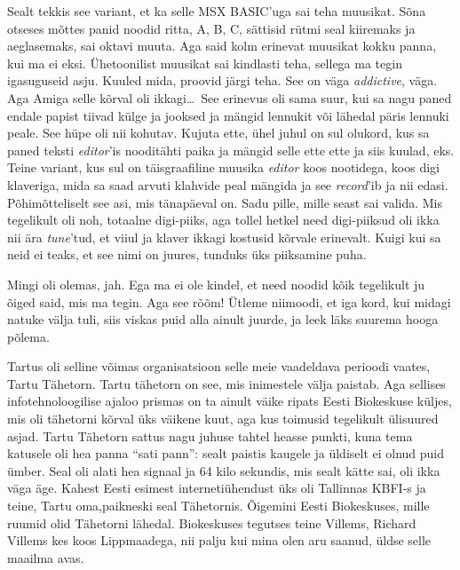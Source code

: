Sealt tekkis see variant, et ka selle MSX BASIC'uga sai teha muusikat. Sõna otseses mõttes panid noodid ritta, A, B, C, sättisid 
rütmi seal kiiremaks ja aeglasemaks, sai oktavi muuta. Aga said 
kolm erinevat muusikat  kokku panna, kui ma ei eksi. Ühetoonilist muusikat sai 
kindlasti teha, sellega ma tegin igasuguseid asju. Kuuled mida, proovid 
järgi teha. See on väga \emph{addictive},  väga. Aga Amiga selle kõrval oli 
ikkagi\ldots\ See erinevus oli sama suur, kui sa nagu paned endale  papist 
tiivad külge ja jooksed ja mängid lennukit või lähedal päris lennuki peale. See 
hüpe oli nii kohutav. Kujuta ette, ühel juhul on sul olukord, kus sa 
paned teksti \emph{editor}'is  nooditähti paika ja mängid selle ette ette ja 
siis kuulad, eks. Teine variant, kus sul on  täisgraafiline muusika 
\emph{editor} koos nootidega,  koos digi klaveriga, mida sa saad arvuti 
klahvide peal mängida ja see \emph{record}'ib ja nii edasi. Põhimõtteliselt 
see asi, mis tänapäeval on. Sadu pille, mille seast sai valida. Mis 
tegelikult oli noh, totaalne digi-piiks, aga tollel hetkel need digi-piiksud 
oli ikka nii ära \emph{tune}'tud, et viiul ja klaver ikkagi kostusid kõrvale 
erinevalt. Kuigi kui sa neid ei teaks, et see nimi on juures, tunduks  üks 
 piiksamine puha. 


Mingi oli olemas, jah. Ega ma ei ole kindel, et need noodid kõik tegelikult ju õiged 
said, mis ma tegin. Aga see rõõm! Ütleme niimoodi, et iga kord, kui midagi 
natuke välja tuli, siis viskas puid alla ainult juurde, ja  
leek läks suurema hooga põlema. 

Tartus oli selline  võimas 
organisatsioon selle meie  vaadeldava  perioodi vaates, Tartu 
Tähetorn.
Tartu tähetorn on see, mis inimestele välja paistab. Aga sellises 
infotehnoloogilise ajaloo prismas on ta ainult väike ripats  Eesti  
Biokeskuse 
küljes, mis oli tähetorni kõrval üks väikene kuut, aga kus toimusid tegelikult 
ülisuured asjad. Tartu Tähetorn sattus nagu juhuse tahtel  heasse 
punkti, kuna tema katusele oli hea panna \enquote{sati pann}: 
 sealt paistis kaugele ja üldiselt  ei olnud puid ümber. Seal oli alati 
hea signaal ja 64 kilo sekundis, mis sealt kätte sai, oli ikka väga äge. Kahest Eesti 
esimest internetiühendust üks oli Tallinnas KBFI-s ja teine, Tartu oma,paikneski 
seal Tähetornis. Õigemini Eesti Biokeskuses, mille ruumid olid Tähetorni 
lähedal. Biokeskuses tegutses teine Villems, Richard Villems kes koos Lippmaadega, nii palju kui mina olen aru saanud, üldse selle  
maailma avas.


